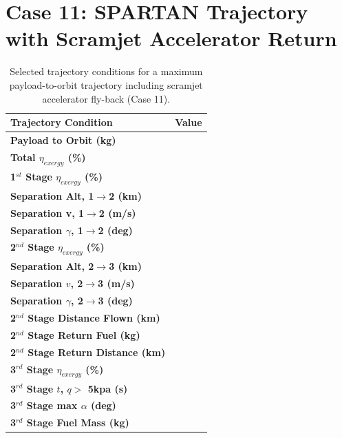 \section{Case 11: SPARTAN Trajectory with Scramjet Accelerator Return}
\begin{table}[ht] %
	\centering
\begin{tabular}{l c } 
	\hline \textbf{Trajectory Condition}
	&Value 
	\\
	\hline \textbf{Payload to Orbit (kg)}
	& \textbf{\PayloadToOrbitStandard}
	\\
	\textbf{Total $\eta_{exergy}$ (\%)}
	& \textbf{\totalExergyEffStandard}
	\\
	\hline 
	\textbf{1$^{st}$ Stage $\eta_{exergy}$ (\%)}
	& \textbf{\firstExergyEffStandard}
	\\

	\textbf{Separation Alt, 1$\rightarrow$2 (km)}
	& \firstsecondSeparationAltStandard
	\\
	\textbf{Separation v, 1$\rightarrow$2 (m/s)}
	& \firstsecondSeparationvStandard
	\\
	\textbf{Separation $\gamma$, 1$\rightarrow$2 (deg)}
	& \firstsecondSeparationgammaStandard
	\\
	\hline 
	\textbf{2$^{nd}$ Stage $\eta_{exergy}$ (\%)}
	& \textbf{\secondExergyEffStandard}
	\\

	\textbf{Separation Alt, 2$\rightarrow$3 (km)}
	& \secondthirdSeparationAltStandard
	\\
	\textbf{Separation $v$, 2$\rightarrow$3 (m/s)}
	& \secondthirdSeparationvStandard
	\\
	\textbf{Separation $\gamma$, 2$\rightarrow$3 (deg)}
	& \secondthirdSeparationgammaStandard
	\\

	\textbf{2$^{nd}$ Stage Distance Flown (km)}
	& \SecondDistStandard
	\\
	\textbf{2$^{nd}$ Stage Return Fuel (kg)}
	& \returnFuelStandard
	\\
	\textbf{2$^{nd}$ Stage Return Distance (km)}
	& \returnDistStandard
	\\
	\hline 
	\textbf{3$^{rd}$ Stage $\eta_{exergy}$ (\%)}
	& \textbf{\thirddExergyEffStandard}
	\\

	\textbf{3$^{rd}$ Stage $t$, $q >$ 5kpa (s)}
	& \thirdqOverFiveStandard
	\\
	\textbf{3$^{rd}$ Stage max $\alpha$ (deg)}
	& \thirdmaxAoAStandard
	\\
	\textbf{3$^{rd}$ Stage Fuel Mass (kg)}
	& \thirdmFuelStandard
	\\
	\hline 
\end{tabular} 
\caption{Selected trajectory conditions for a maximum payload-to-orbit trajectory including scramjet accelerator fly-back (Case 11).}
\end{table}

